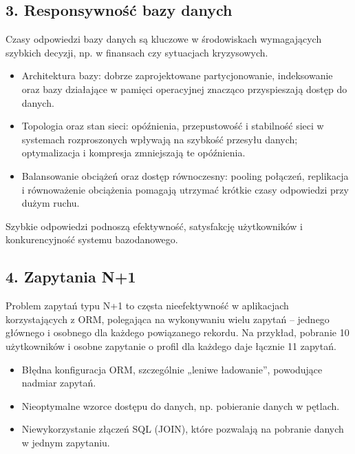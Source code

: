 \documentclass[a4paper,11pt,polish]{sphinxmanual}
\begin{document}
\subsection{3. Responsywność bazy danych}
\label{\detokenize{Wydajnosc-Skalowanie-i-Replikacja/index:responsywnosc-bazy-danych}}
\sphinxAtStartPar
Czasy odpowiedzi bazy danych są kluczowe w środowiskach wymagających szybkich decyzji, np. w finansach czy sytuacjach kryzysowych.
\begin{description}
\begin{itemize}
\item {} 
\sphinxAtStartPar
Architektura bazy: dobrze zaprojektowane partycjonowanie, indeksowanie oraz bazy działające w pamięci operacyjnej znacząco przyspieszają dostęp do danych.

\item {} 
\sphinxAtStartPar
Topologia oraz stan sieci: opóźnienia, przepustowość i stabilność sieci w systemach rozproszonych wpływają na szybkość przesyłu danych; optymalizacja i kompresja zmniejszają te opóźnienia.

\item {} 
\sphinxAtStartPar
Balansowanie obciążeń oraz dostęp równoczesny: pooling połączeń, replikacja i równoważenie obciążenia pomagają utrzymać krótkie czasy odpowiedzi przy dużym ruchu.

\end{itemize}

\end{description}

\sphinxAtStartPar
Szybkie odpowiedzi podnoszą efektywność, satysfakcję użytkowników i konkurencyjność systemu bazodanowego.


\subsection{4. Zapytania N+1}
\label{\detokenize{Wydajnosc-Skalowanie-i-Replikacja/index:zapytania-n-1}}
\sphinxAtStartPar
Problem zapytań typu N+1 to częsta nieefektywność w aplikacjach korzystających z ORM, polegająca na wykonywaniu wielu zapytań – jednego głównego i osobnego dla każdego powiązanego rekordu. Na przykład, pobranie 10 użytkowników i osobne zapytanie o profil dla każdego daje łącznie 11 zapytań.
\begin{description}
\begin{itemize}
\item {} 
\sphinxAtStartPar
Błędna konfiguracja ORM, szczególnie „leniwe ładowanie”, powodujące nadmiar zapytań.

\item {} 
\sphinxAtStartPar
Nieoptymalne wzorce dostępu do danych, np. pobieranie danych w pętlach.

\item {} 
\sphinxAtStartPar
Niewykorzystanie złączeń SQL (JOIN), które pozwalają na pobranie danych w jednym zapytaniu.

\end{itemize}

\end{description}
\end{document}
